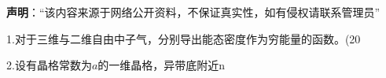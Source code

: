 
\textbf{声明}：“该内容来源于网络公开资料，不保证真实性，如有侵权请联系管理员”

1.对于三维与二维自由中子气，分别导出能态密度作为穷能量的函数。(20

2.设有晶格常数为$a$的一维晶格，异带底附近n














